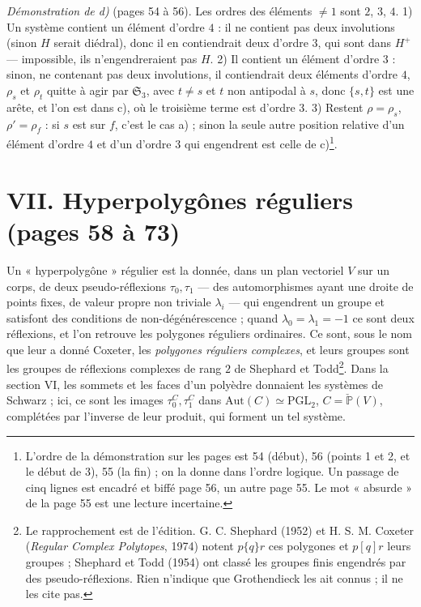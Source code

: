 \documentclass[11pt,a4paper]{article}
\begin{document}
\emph{Démonstration de d)} (pages 54 à 56). Les ordres des éléments $\neq 1$
sont $2$, $3$, $4$. 1) Un système contient un élément d'ordre $4$ : il ne
contient pas deux involutions (sinon $H$ serait diédral), donc il en
contiendrait deux d'ordre $3$, qui sont dans $H^+$ --- impossible, ils
n'engendreraient pas $H$. 2) Il contient un élément d'ordre $3$ : sinon, ne
contenant pas deux involutions, il contiendrait deux éléments d'ordre $4$,
$\rho_s$ et $\rho_t$ quitte à agir par $\mathfrak{S}_3$, avec $t \neq s$ et
$t$ non antipodal à $s$, donc $\{s, t\}$ est une arête, et l'on est dans c), où
le troisième terme est d'ordre $3$. 3) Restent $\rho = \rho_s$, $\rho' =
\rho_f$ : si $s$ est sur $f$, c'est le cas a) ; sinon la seule autre position
relative d'un élément d'ordre $4$ et d'un d'ordre $3$ qui engendrent est celle
de c)\footnote{L'ordre de la démonstration sur les pages est 54 (début), 56
(points 1 et 2, et le début de 3), 55 (la fin) ; on la donne dans l'ordre
logique. Un passage de cinq lignes est encadré et biffé page 56, un autre
page 55. Le mot « absurde » de la page 55 est une lecture incertaine.}.

\section*{VII. Hyperpolygônes réguliers (pages 58 à 73)}

Un « hyperpolygône » régulier est la donnée, dans un plan vectoriel $V$ sur un
corps, de deux pseudo-réflexions $\tau_0, \tau_1$ --- des automorphismes
ayant une droite de points fixes, de valeur propre non triviale $\lambda_i$ ---
qui engendrent un groupe et satisfont des conditions de non-dégénérescence ;
quand $\lambda_0 = \lambda_1 = -1$ ce sont deux réflexions, et l'on retrouve
les polygones réguliers ordinaires. Ce sont, sous le nom que leur a donné
Coxeter, les \emph{polygones réguliers complexes}, et leurs groupes sont les
groupes de réflexions complexes de rang $2$ de Shephard et Todd\footnote{Le
rapprochement est de l'édition. G. C. Shephard (1952) et H. S. M. Coxeter
(\emph{Regular Complex Polytopes}, 1974) notent $p\{q\}r$ ces polygones et
$p[q]r$ leurs groupes ; Shephard et Todd (1954) ont classé les groupes finis
engendrés par des pseudo-réflexions. Rien n'indique que Grothendieck les ait
connus ; il ne les cite pas.}. Dans la section VI, les sommets et les faces
d'un polyèdre donnaient les systèmes de Schwarz ; ici, ce sont les images
$\tau_0^C, \tau_1^C$ dans $\mathrm{Aut}(C) \simeq \mathrm{PGL}_2$, $C =
\check{\mathbb{P}}(V)$, complétées par l'inverse de leur produit, qui forment
un tel système.
\end{document}
